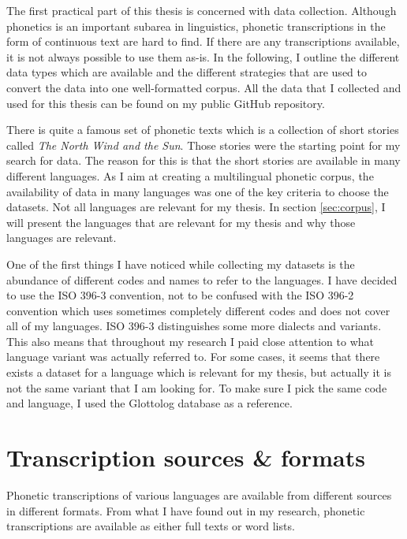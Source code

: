 \label{chap:data_collection}
The first practical part of this thesis is concerned with data collection. Although phonetics is an important subarea in linguistics, phonetic transcriptions in the form of continuous text are hard to find. If there are any transcriptions available, it is not always possible to use them as-is. In the following, I outline the different data types which are available and the different strategies that are used to convert the data into one well-formatted corpus. All the data that I collected and used for this thesis can be found on my public GitHub repository. 

There is quite a famous set of phonetic texts which is a collection of short stories called \textit{The North Wind and the Sun}. Those stories were the starting point for my search for data. The reason for this is that the short stories are available in many different languages. As I aim at creating a multilingual phonetic corpus, the availability of data in many languages was one of the key criteria to choose the datasets. Not all languages are relevant for my thesis. In section \ref{sec:corpus}, I will present the languages that are relevant for my thesis and why those languages are relevant.

One of the first things I have noticed while collecting my datasets is the abundance of different codes and names to refer to the languages. I have decided to use the ISO 396-3 convention, not to be confused with the ISO 396-2 convention which uses sometimes completely different codes and does not cover all of my languages. ISO 396-3 distinguishes some more dialects and variants. This also means that throughout my research I paid close attention to what language variant was actually referred to. For some cases, it seems that there exists a dataset for a language which is relevant for my thesis, but actually it is not the same variant that I am looking for. To make sure I pick the same code and language, I used the Glottolog database as a reference.


\section{Transcription sources \& formats}
Phonetic transcriptions of various languages are available from different sources in different formats. From what I have found out in my research, phonetic transcriptions are available as either full texts or word lists.

